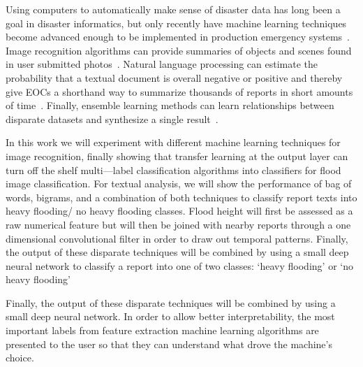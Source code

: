   Using computers to automatically make sense of disaster data has long
  been a goal in disaster informatics, but only recently have machine
  learning techniques become advanced enough to be implemented in production
  emergency systems~\cite{meierDigitalHumanitariansHow2015}. Image
  recognition algorithms can provide summaries of objects and scenes found
  in user submitted photos~\cite{nguyenRapidClassificationCrisisRelated,
  donahueDeCAFDeepConvolutional2013}. Natural language processing can
  estimate the probability that a textual document is overall negative or
  positive and thereby give EOCs a shorthand way to summarize thousands of
  reports in short amounts of
  time~\cite{nguyenRapidClassificationCrisisRelated,
  nagyCrowdSentimentDetection2012}. Finally, ensemble learning methods can
  learn relationships between disparate datasets and synthesize a single
  result~\cite{mouzannarDamageIdentificationSocial2018}.
  
  In this work we will experiment with different machine learning techniques
  for image recognition, finally showing that transfer learning at the 
  output layer can turn off the shelf multi---label  classification
  algorithms into classifiers for flood image classification. For textual analysis, 
  we will show the performance of bag of words, bigrams, and a combination of 
  both techniques to classify report texts into heavy flooding/ no heavy flooding classes.
  Flood height will first be assessed as a raw numerical feature but will then be 
  joined with nearby reports through a one dimensional convolutional filter in order
  to draw out temporal patterns. Finally, the output of these disparate
  techniques will be combined by using a small deep neural network to classify
  a report into one of two classes: `heavy flooding' or `no heavy flooding'

  Finally, the output of these disparate techniques will be combined by using a 
  small deep neural network. In order to allow better interpretability, the
  most important labels from feature extraction machine learning algorithms are
  presented to the user so that they can understand what drove the machine's
  choice.
  
